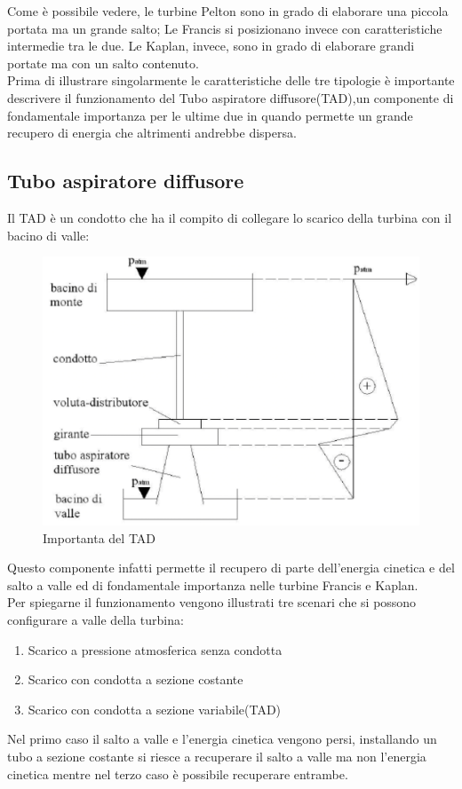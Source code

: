 Come è possibile vedere, le turbine Pelton sono in grado di elaborare una piccola portata ma un grande salto; Le Francis si posizionano invece con caratteristiche intermedie tra le due. Le Kaplan, invece, sono in grado di elaborare grandi portate ma con un salto contenuto.\\
Prima di illustrare singolarmente le caratteristiche delle tre tipologie è importante descrivere il funzionamento del Tubo aspiratore diffusore(TAD),un componente di fondamentale importanza per le ultime due in quando permette un grande recupero di energia che altrimenti andrebbe dispersa.
\subsection{Tubo aspiratore diffusore}
Il TAD è un condotto che ha il compito di collegare lo scarico della turbina con il bacino di valle:
\begin{figure}[H]
    \centering
    \includegraphics[height=0.4\textwidth]{res/cap 3/francis con TAD}
    \caption{Importanta del TAD}
\end{figure}\noindent
Questo componente infatti permette il recupero di parte dell'energia cinetica e del salto a valle ed di fondamentale importanza nelle turbine Francis e Kaplan.\\
Per spiegarne il funzionamento vengono illustrati tre scenari che si possono configurare a valle della turbina:
\begin{enumerate}
    \item Scarico a pressione atmosferica senza condotta
    \item Scarico con condotta a sezione costante
    \item Scarico con condotta a sezione variabile(TAD)
\end{enumerate}
Nel primo caso il salto a valle e l'energia cinetica vengono persi, installando un tubo a sezione costante si riesce a recuperare il salto a valle ma non l'energia cinetica mentre nel terzo caso è possibile recuperare entrambe.
